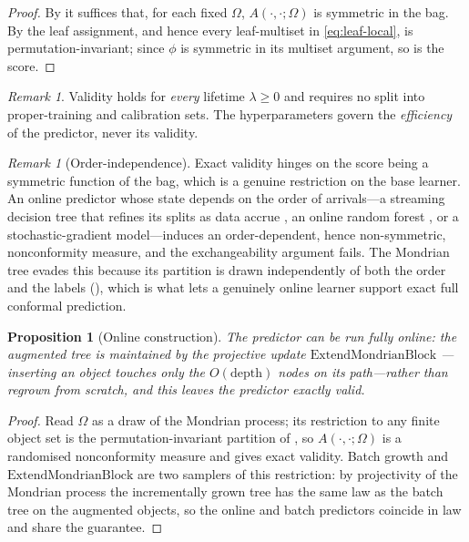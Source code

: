 \documentclass[twoside]{article}
\numberwithin{equation}{section}
\theoremstyle{plain}
\newtheorem{proposition}[theorem]{Proposition}
\theoremstyle{definition}
\theoremstyle{remark}
\newtheorem{remark}[theorem]{Remark}
\begin{document}
\begin{proof}
By  it suffices that, for each fixed $\Omega$,
$A(\cdot, \cdot; \Omega)$ is symmetric in the bag. By 
the leaf assignment, and hence every leaf-multiset in \eqref{eq:leaf-local}, is
permutation-invariant; since $\phi$ is symmetric in its multiset argument, so is the
score.
\end{proof}

\begin{remark}\label{rem:hyperparams}
Validity holds for \emph{every} lifetime $\lambda \ge 0$ and requires no split
into proper-training and calibration sets. The hyperparameters govern the
\emph{efficiency} of the predictor, never its validity.
\end{remark}

\begin{remark}[Order-independence]\label{rem:order}
Exact validity hinges on the score being a symmetric function of the bag,
which is a genuine restriction on the base learner. An online predictor whose state
depends on the order of arrivals---a streaming decision tree that refines its
splits as data accrue \citep{domingos2000mining}, an online random forest
\citep{saffari2009online}, or a stochastic-gradient model---induces an order-dependent, hence non-symmetric, nonconformity measure, and the
exchangeability argument fails. The Mondrian tree evades this because its partition
is drawn independently of both the order and the labels (),
which is what lets a genuinely online learner support exact full conformal
prediction.
\end{remark}

\begin{proposition}[Online construction]\label{prop:online-validity}
The predictor can be run fully online: the augmented tree is maintained by the projective
update $\mathrm{ExtendMondrianBlock}$ \citep{roy2009mondrian, lakshminarayanan2014mondrian}---inserting an object touches only the $O(\mathrm{depth})$ nodes on its path---rather
than regrown from scratch, and this leaves the predictor exactly valid.
\end{proposition}

\begin{proof}
Read $\Omega$ as a draw of the Mondrian process; its restriction to any finite object set
is the permutation-invariant partition of , so $A(\cdot,\cdot;\Omega)$
is a randomised nonconformity measure and  gives exact
validity. Batch growth and $\mathrm{ExtendMondrianBlock}$ are two samplers of this
restriction: by projectivity of the Mondrian process the incrementally grown tree has the
same law as the batch tree on the augmented objects, so the online and batch predictors
coincide in law and share the guarantee.
\end{proof}
\end{document}
